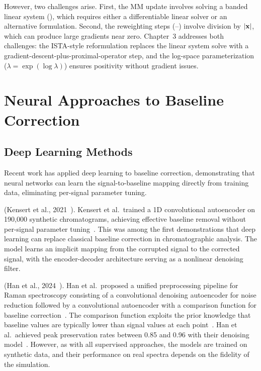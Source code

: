 However, two challenges arise. First, the MM update involves solving a banded linear system (), which requires either a differentiable linear solver or an alternative formulation. Second, the reweighting steps (--) involve division by $|\mathbf{x}|$, which can produce large gradients near zero. Chapter~3 addresses both challenges: the ISTA-style reformulation replaces the linear system solve with a gradient-descent-plus-proximal-operator step, and the log-space parameterization ($\lambda = \exp(\log \lambda)$) ensures positivity without gradient issues.


\section{Neural Approaches to Baseline Correction}
\label{sec:bg_neural}

\subsection{Deep Learning Methods}
\label{sec:bg_neural_dl}

Recent work has applied deep learning to baseline correction, demonstrating that neural networks can learn the signal-to-baseline mapping directly from training data, eliminating per-signal parameter tuning.

 (Kensert et al., 2021~\cite{kensert2021deep}). Kensert et al.\ trained a 1D convolutional autoencoder on 190,000 synthetic chromatograms, achieving effective baseline removal without per-signal parameter tuning~\cite{kensert2021deep}. This was among the first demonstrations that deep learning can replace classical baseline correction in chromatographic analysis. The model learns an implicit mapping from the corrupted signal to the corrected signal, with the encoder-decoder architecture serving as a nonlinear denoising filter.

 (Han et al., 2024~\cite{han2024caeplus}). Han et al.\ proposed a unified preprocessing pipeline for Raman spectroscopy consisting of a convolutional denoising autoencoder for noise reduction followed by a convolutional autoencoder with a comparison function for baseline correction~\cite{han2024caeplus}. The comparison function exploits the prior knowledge that baseline values are typically lower than signal values at each point~\cite{han2024caeplus}. Han et al.\ achieved peak preservation rates between 0.85 and 0.96 with their denoising model~\cite{han2024caeplus}. However, as with all supervised approaches, the models are trained on synthetic data, and their performance on real spectra depends on the fidelity of the simulation.

